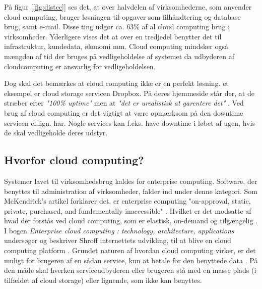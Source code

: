 \newpage
På figur [\ref{fig:distcc}] ses det, at over halvdelen af virksomhederne, som anvender cloud computing, bruger løsningen til opgaver som filhåndtering og database brug, samt e-mail. Disse ting udgør ca. 63\% af al cloud computing brug i virksomheder. Yderligere vises det at over en tredjedel benytter det til infrastruktur, kundedata, økonomi mm. Cloud computing mindsker også mængden af tid der bruges på vedligeholdelse af systemet da udbyderen af cloudcomputing er ansvarlig for vedligeholdelsen. 

Dog skal det bemærkes at cloud computing ikke er en perfekt løsning. et eksempel er cloud storage servicen Dropbox. På deres hjemmeside står der, at de stræber efter \textit{"100\% uptime"} men at \textit{"det er urealistisk at garentere det"} \citep{drpbx_downtime}. Ved brug af cloud computing er det vigtigt at være opmærksom på den downtime servicen el.lign. har. Nogle services kan f.eks. have downtime i løbet af ugen, hvis de skal vedligeholde deres udstyr.

\subsection{Hvorfor cloud computing?}
Systemer lavet til virksomhedsbrug kaldes for enterprise computing. Software, der benyttes til administration af virksomheder, falder ind under denne kategori. Som McKendrick's artikel forklarer det, er enterprise  computing "on-approval, static, private, purchased, and fundamentally inaccessible" \citep{McKendrick2014}. Hvilket er det modsatte af hvad der forstås ved cloud computing, som er elastisk, on-demand og tilgængelig \citep{McKendrick2014}. I bogen \textit{Enterprise cloud computing : technology, architecture, applications} undersøger og beskriver Shroff internettets udvikling, til at blive en cloud computing platform \citep{Shroff2010}. Grundet naturen af hvordan cloud computing virker, er det muligt for brugeren af en sådan service, kun at betale for den benyttede data \citep{Shroff2010}. På den måde skal hverken serviceudbyderen eller brugeren stå med en masse plads (i tilfældet af cloud storage) eller lignende, som ikke kan benyttes. %


